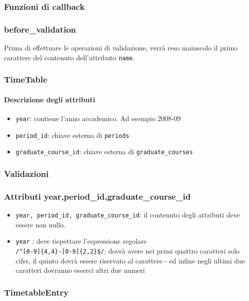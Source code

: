 \documentclass[11pt,a4paper]{article}
\begin{document}
\subsubsection*{Funzioni di callback}
\subsubsection*{before\_validation}
Prima di effettuare le operazioni di validazione, verrà reso maiuscolo il primo carattere del contenuto dell'attributo \verb|name|.
\subsubsection{TimeTable}
\paragraph{Descrizione degli attributi}
 \begin{itemize}
  \item \verb|year|: contiene l'anno accademico. Ad esempio 2008-09
  \item \verb|period_id|: chiave esterna di \verb|periods|
  \item \verb|graduate_course_id|: chiave esterna di \verb|graduate_courses|
 \end{itemize}
\subsubsection*{Validazioni}
\subsubsection*{Attributi year,period\_id,graduate\_course\_id}
\begin{itemize}
 \item \verb|year, period_id, graduate_course_id|: il contenuto degli attributi deve essere non nullo.
 \item \verb|year| : deve rispettare l'espressione regolare\\ \verb|/^[0-9]{4,4}-[0-9]{2,2}$/|; dovrà avere nei primi quattro caratteri solo cifre, il quinto dovrà essere riservato al carattere - ed infine negli ultimi due caratteri dovranno esserci altri due numeri
\end{itemize}
\subsubsection{TimetableEntry}
\end{document}
